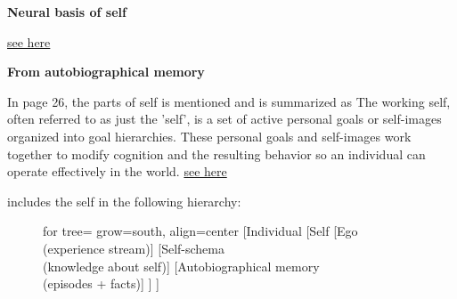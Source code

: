 \documentclass{book}
\newcommand{\seehere}[1]{\href{#1}{see here}}
\providecommand{\ProjectDeepHeading}[2]{%
    \par\medskip\noindent\textbf{#2}\par\smallskip
}
\providecommand{\seehere}[1]{\href{#1}{see here}}
\begin{document}

\ProjectDeepHeading{6}{Neural basis of self}
		\seehere{https://en.wikipedia.org/wiki/Neural_basis_of_self}
	
	\ProjectDeepHeading{6}{From autobiographical memory}
		In \cite{brewer-1986-what-is-autobiographical-memory} page 26, the parts of self is mentioned and is summarized as
		The working self, often referred to as just the 'self', is a set of active personal goals or self-images organized into goal hierarchies. These personal goals and self-images work together to modify cognition and the resulting behavior so an individual can operate effectively in the world.
		\seehere{https://en.wikipedia.org/wiki/Autobiographical_memory?utm_source=chatgpt.com\#Working_self}
	
	\cite{brewer-1986-what-is-autobiographical-memory} includes the self in the following hierarchy:
	
	\begin{figure}[H]
		\centering
		\begin{forest}
			for tree={
				grow=south,
				align=center
			}
			[Individual
				[Self
					[Ego\\(experience stream)]
					[Self-schema\\(knowledge about self)]
					[Autobiographical memory\\(episodes + facts)]
				]
			]
		\end{forest}
	\end{figure}
	
\end{document}
